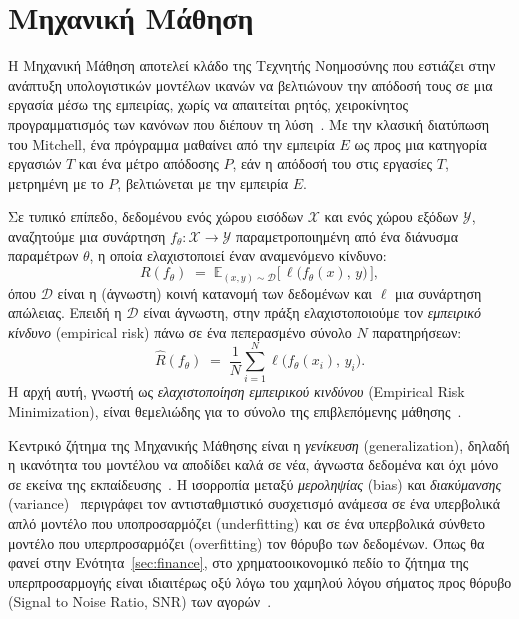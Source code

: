 \section{Μηχανική Μάθηση}
\label{sec:ml}

Η Μηχανική Μάθηση αποτελεί
κλάδο της Τεχνητής Νοημοσύνης που εστιάζει στην ανάπτυξη υπολογιστικών μοντέλων
ικανών να βελτιώνουν την απόδοσή τους σε μια εργασία μέσω της εμπειρίας, χωρίς
να απαιτείται ρητός, χειροκίνητος προγραμματισμός των κανόνων που διέπουν τη
λύση~\cite{mitchell1997,bishop2006}. Με την κλασική διατύπωση του
Mitchell, ένα πρόγραμμα μαθαίνει από την εμπειρία
$E$ ως προς μια κατηγορία εργασιών $T$ και ένα μέτρο απόδοσης $P$, εάν η
απόδοσή του στις εργασίες $T$, μετρημένη με το $P$, βελτιώνεται με την
εμπειρία $E$.

Σε τυπικό επίπεδο, δεδομένου ενός χώρου εισόδων $\mathcal{X}$ και ενός χώρου
εξόδων $\mathcal{Y}$, αναζητούμε μια συνάρτηση $f_\theta : \mathcal{X}\rightarrow \mathcal{Y}$ 
παραμετροποιημένη από ένα διάνυσμα παραμέτρων $\theta$, 
η οποία ελαχιστοποιεί έναν αναμενόμενο κίνδυνο:
\begin{equation}
    R(f_\theta) \;=\; \mathbb{E}_{(x,y)\sim \mathcal{D}}
    \big[\, \ell\big(f_\theta(x),\, y\big) \,\big],
    \label{eq:expected-risk}
\end{equation}
όπου $\mathcal{D}$ είναι η (άγνωστη) κοινή κατανομή των δεδομένων και $\ell$
μια συνάρτηση απώλειας. Επειδή η $\mathcal{D}$ είναι άγνωστη, στην πράξη
ελαχιστοποιούμε τον \emph{εμπειρικό κίνδυνο}
(empirical risk) πάνω σε ένα πεπερασμένο σύνολο
$N$ παρατηρήσεων:
\begin{equation}
    \hat{R}(f_\theta) \;=\; \frac{1}{N}\sum_{i=1}^{N}
    \ell\big(f_\theta(x_i),\, y_i\big).
    \label{eq:empirical-risk}
\end{equation}
Η αρχή αυτή, γνωστή ως \emph{ελαχιστοποίηση εμπειρικού κινδύνου}
(Empirical Risk Minimization), είναι θεμελιώδης
για το σύνολο της επιβλεπόμενης μάθησης~\cite{bishop2006,hastie2009}.

Κεντρικό ζήτημα της Μηχανικής Μάθησης είναι η \emph{γενίκευση}
(generalization), δηλαδή η ικανότητα του μοντέλου να
αποδίδει καλά σε νέα, άγνωστα δεδομένα και όχι μόνο σε εκείνα της εκπαίδευσης~\cite{goodfellow2016}.
Η ισορροπία μεταξύ \emph{μεροληψίας} (bias) και
\emph{διακύμανσης} (variance)~\cite{hastie2009}
περιγράφει τον αντισταθμιστικό συσχετισμό ανάμεσα σε ένα υπερβολικά απλό
μοντέλο που υποπροσαρμόζει (underfitting) και σε
ένα υπερβολικά σύνθετο μοντέλο που υπερπροσαρμόζει
(overfitting) τον θόρυβο των δεδομένων. Όπως θα
φανεί στην Ενότητα~\ref{sec:finance}, στο χρηματοοικονομικό πεδίο το ζήτημα
της υπερπροσαρμογής είναι ιδιαιτέρως οξύ λόγω του χαμηλού λόγου σήματος προς
θόρυβο (Signal to Noise Ratio, SNR) των αγορών~\cite{hambly2023rlfinance}.

